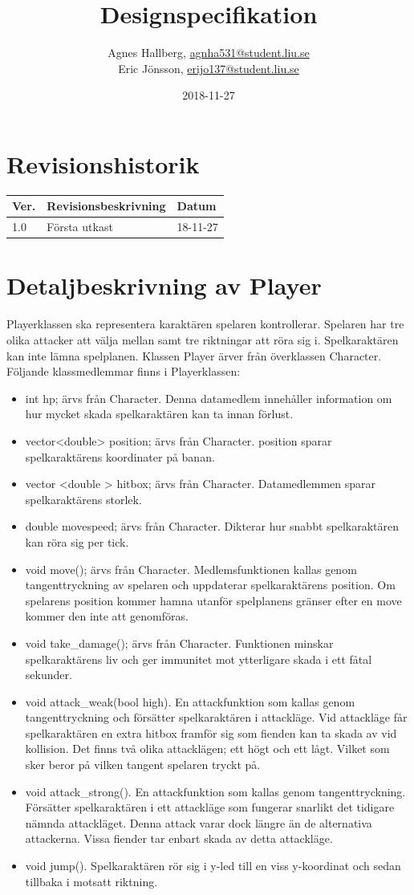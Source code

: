 \documentclass{TDP005mall}
\author{Agnes Hallberg, \url{agnha531@student.liu.se}\\
  Eric Jönsson, \url{erijo137@student.liu.se}}
\title{Designspecifikation}
\date{2018-11-27}
\begin{document}
\projectpage

\section*{Revisionshistorik}
\begin{table}[!h]
\begin{tabularx}{\linewidth}{|l|X|l|}
\hline
Ver. & Revisionsbeskrivning & Datum \\\hline
1.0 & Första utkast  & 18-11-27 \\\hline
\end{tabularx}
\end{table}

\section{Detaljbeskrivning av Player}
Playerklassen ska representera karaktären spelaren kontrollerar. Spelaren har tre olika attacker att välja mellan samt tre riktningar att röra sig i. Spelkaraktären kan inte lämna spelplanen. Klassen Player ärver från överklassen Character. Följande klassmedlemmar finns i Playerklassen:
\begin{itemize}
\item int hp; ärvs från Character. Denna datamedlem innehåller information om hur mycket skada spelkaraktären kan ta innan förlust.
\item vector<double> position; ärvs från Character. position sparar spelkaraktärens koordinater på banan.
\item vector <double > hitbox; ärvs från Character. Datamedlemmen sparar spelkaraktärens storlek.
\item double movespeed; ärvs från Character. Dikterar hur snabbt spelkaraktären kan röra sig per tick.
\item void move(); ärvs från Character. Medlemsfunktionen kallas genom tangenttryckning av spelaren och uppdaterar spelkaraktärens position. Om spelarens position kommer hamna utanför spelplanens gränser efter en move kommer den inte att genomföras.
\item void take\_damage(); ärvs från Character. Funktionen minskar spelkaraktärens liv och ger immunitet mot ytterligare skada i ett fåtal sekunder.
\item void attack\_weak(bool high). En attackfunktion som kallas genom tangenttryckning och försätter spelkaraktären i attackläge. Vid attackläge får spelkaraktären en extra hitbox framför sig som fienden kan ta skada av vid kollision. Det finns två olika attacklägen; ett högt och ett lågt. Vilket som sker beror på vilken tangent spelaren tryckt på.
\item void attack\_strong(). En attackfunktion som kallas genom tangenttryckning. Försätter spelkaraktären i ett attackläge som fungerar snarlikt det tidigare nämnda attackläget. Denna attack varar dock längre än de alternativa attackerna. Vissa fiender tar enbart skada av detta attackläge.
\item void jump(). Spelkaraktären rör sig i y-led till en viss y-koordinat och sedan tillbaka i motsatt riktning.
\end{itemize}
\end{document}
